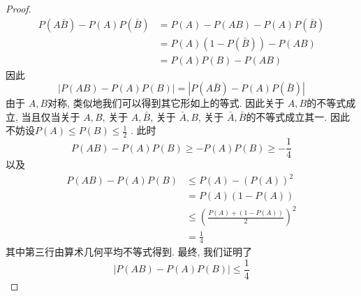 \documentclass[../main.tex]{subfiles}
\begin{document}
\begin{proof}
   \[
   \begin{aligned}
   P\left(  A \bar{B} \right)-P\left( A \right) P\left( \bar{B} \right) &= P\left( A \right)-P\left( AB \right)   -P\left( A \right)P\left( \bar{B} \right)\\ 
    &=  P\left( A \right)\left( 1-P\left( \bar{B} \right)  \right)-P\left( AB \right)\\ 
     &= P\left( A \right)P\left( B \right)-P\left( AB \right)      
   \end{aligned}  \tag{*}
   \]因此 \[
   \left| P\left( AB \right)-P\left( A \right)P\left( B \right)    \right|= \left| P\left( A \bar{B} \right)-P\left( A \right)P\left( \bar{B} \right)    \right|  
   \]由于 \(  A,B  \)对称, 类似地我们可以得到其它形如上的等式. 因此关于 \(  A,B  \)的不等式成立, 当且仅当关于 \(  A,B  \),  关于 \(  A, \bar{B}  \), 关于 \(  \bar{A},B  \), 关于 \(  \bar{A},\bar{B}  \)的不等式成立其一.    因此不妨设\(  P\left( A \right)\le  P\left( B \right)\le  \frac{1 }{2 }      \) . 此时 \[
   P\left( AB \right)-P\left( A \right)P\left( B \right)\ge -P\left( A \right)P\left( B \right)\ge -\frac{1 }{4 }      
   \]以及 \[
   \begin{aligned}
   P\left( AB \right)-P\left( A \right)P\left( B \right)&\le P\left( A \right)-\left( P\left( A \right)  \right)^{2}\\ 
    &= P\left( A \right)\left( 1-P\left( A \right)  \right)   \\ 
     &\le \left( \frac{P\left( A \right)+ \left( 1-P\left( A \right)  \right)   }{2 }  \right)^{2}\\ 
      &= \frac{1 }{4 }   
   \end{aligned} 
   \]其中第三行由算术几何平均不等式得到. 最终, 我们证明了 \[
   \left| P\left( AB \right)-P\left( A \right)P\left( B \right)    \right|\le \frac{1 }{4 }  
   \]
\end{proof}
\end{document}
